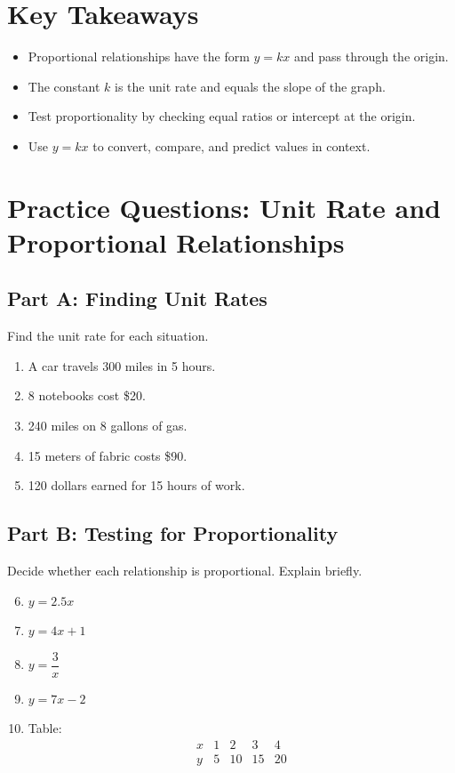 \documentclass[14pt]{extarticle}
\begin{document}
\section*{Key Takeaways}
\begin{itemize}
  \item Proportional relationships have the form \(y = kx\) and pass through the origin.
  \item The constant \(k\) is the unit rate and equals the slope of the graph.
  \item Test proportionality by checking equal ratios or intercept at the origin.
  \item Use \(y = kx\) to convert, compare, and predict values in context.
\end{itemize}

\newpage


\section*{Practice Questions: Unit Rate and Proportional Relationships}

\subsection*{Part A: Finding Unit Rates}
Find the unit rate for each situation.
\begin{enumerate}
  \item A car travels 300 miles in 5 hours.
  \item 8 notebooks cost \$20.
  \item 240 miles on 8 gallons of gas.
  \item 15 meters of fabric costs \$90.
  \item 120 dollars earned for 15 hours of work.
\end{enumerate}

\subsection*{Part B: Testing for Proportionality}
Decide whether each relationship is proportional. Explain briefly.
\begin{enumerate}
  \setcounter{enumi}{5}
  \item \(y = 2.5x\)
  \item \(y = 4x + 1\)
  \item \(y = \dfrac{3}{x}\)
  \item \(y = 7x - 2\)
  \item Table:  
  \[
  \begin{array}{c|cccc}
  x & 1 & 2 & 3 & 4\\ \hline
  y & 5 & 10 & 15 & 20
  \end{array}
  \]
\end{enumerate}
\end{document}
